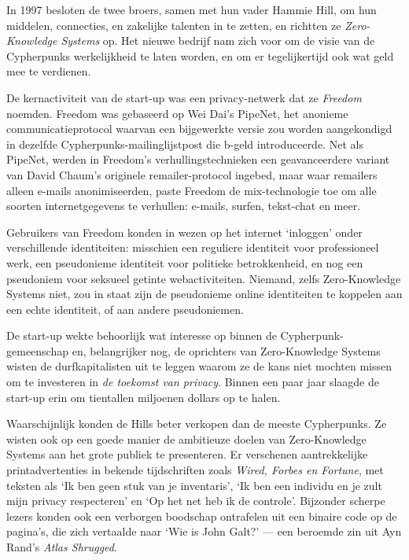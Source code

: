 \documentclass[
  a5paper,
  smalldemyvopaper,11pt,twoside,onecolumn,openright,extrafontsizes]{memoir}
\begin{document}
In 1997 besloten de twee broers, samen met hun vader Hammie Hill, om hun
middelen, connecties, en zakelijke talenten in te zetten, en richtten ze
\emph{Zero-Knowledge Systems} op. Het nieuwe bedrijf nam zich voor om de
visie van de Cypherpunks werkelijkheid te laten worden, en om er
tegelijkertijd ook wat geld mee te verdienen.

De kernactiviteit van de start-up was een privacy-netwerk dat ze
\emph{Freedom} noemden. Freedom was gebaseerd op Wei Dai's PipeNet, het
anonieme communicatieprotocol waarvan een bijgewerkte versie zou worden
aangekondigd in dezelfde Cypherpunks-mailinglijstpost die b-geld
introduceerde. Net als PipeNet, werden in Freedom's
verhullingstechnieken een geavanceerdere variant van David Chaum's
originele remailer-protocol ingebed, maar waar remailers alleen e-mails
anonimiseerden, paste Freedom de mix-technologie toe om alle soorten
internetgegevens te verhullen: e-mails, surfen, tekst-chat en meer.

Gebruikers van Freedom konden in wezen op het internet `inloggen' onder
verschillende identiteiten: misschien een reguliere identiteit voor
professioneel werk, een pseudonieme identiteit voor politieke
betrokkenheid, en nog een pseudoniem voor seksueel getinte
webactiviteiten. Niemand, zelfs Zero-Knowledge Systems niet, zou in
staat zijn de pseudonieme online identiteiten te koppelen aan een echte
identiteit, of aan andere pseudoniemen.

De start-up wekte behoorlijk wat interesse op binnen de
Cypherpunk-gemeenschap en, belangrijker nog, de oprichters van
Zero-Knowledge Systems wisten de durfkapitalisten uit te leggen waarom
ze de kans niet mochten missen om te investeren in \emph{de toekomst van
privacy}. Binnen een paar jaar slaagde de start-up erin om tientallen
miljoenen dollars op te halen.

Waarschijnlijk konden de Hills beter verkopen dan de meeste Cypherpunks.
Ze wisten ook op een goede manier de ambitieuze doelen van
Zero-Knowledge Systems aan het grote publiek te presenteren. Er
verschenen aantrekkelijke printadvertenties in bekende tijdschriften
zoals \emph{Wired, Forbes en Fortune}, met teksten als `Ik ben geen stuk
van je inventaris', `Ik ben een individu en je zult mijn privacy
respecteren' en `Op het net heb ik de controle'. Bijzonder scherpe
lezers konden ook een verborgen boodschap ontrafelen uit een binaire
code op de pagina's, die zich vertaalde naar `Wie is John Galt?' --- een
beroemde zin uit Ayn Rand's \emph{Atlas Shrugged}.
\end{document}
